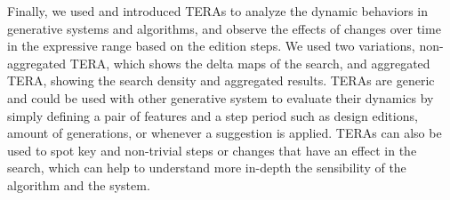 
Finally, we used and introduced TERAs to analyze the dynamic behaviors in generative systems and algorithms, and observe the effects of changes over time in the expressive range based on the edition steps. We used two variations, non-aggregated TERA, which shows the delta maps of the search, and aggregated TERA, showing the search density and aggregated results. TERAs are generic and could be used with other generative system to evaluate their dynamics by simply defining a pair of features and a step period such as design editions, amount of generations, or whenever a suggestion is applied. TERAs can also be used to spot key and non-trivial steps or changes that have an effect in the search, which can help to understand more in-depth the sensibility of the algorithm and the system. 



